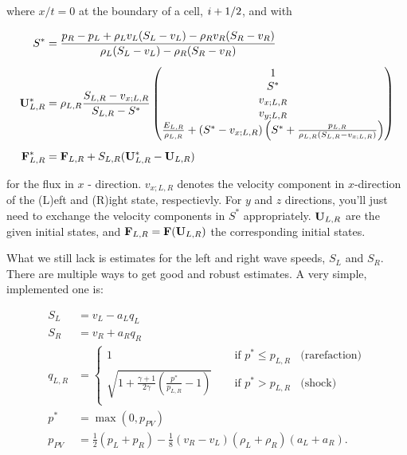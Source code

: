 where $x/t = 0$ at the boundary of a cell, $i+1/2$, and with

\begin{align}
S^* &=
	\frac{
		p_R - p_L  + \rho_L v_L (S_L - v_L) - \rho_R v_R (S_R - v_R)
	} {
		\rho_L (S_L - v_L) - \rho_R (S_R - v_R)
	}
	\label{eq:hllc-sstar}\\[.5em]
%
\U^*_{L,R} &=
	\rho_{L,R} \frac{ S_{L,R} - v_{x;L,R}}{S_{L,R} - S^*}
	\begin{pmatrix}
		1\\
		S^*\\
		v_{x;L,R}\\
		v_{y;L,R}\\
		\frac{E_{L,R}}{\rho_{L,R}} +
		(S^* - v_{x;L,R})
		\left(
			S^* + \frac{p_{L,R}}{\rho_{L,R}(S_{L,R} - v_{x;L,R})}
		\right)
	\end{pmatrix} \\[.5em]
%
\F^*_{L,R} &=
	\F_{L, R} + S_{L,R} ( \U^*_{L,R} - \U_{L,R} )
\end{align}

for the flux in $x$ - direction. $v_{x;L,R}$ denotes the velocity component in
$x$-direction of the (L)eft and (R)ight state, respectievly. For $y$ and $z$
directions, you'll just need to exchange the velocity components in $S^*$
appropriately. $\mathbf{U}_{L,R}$ are the given initial states, and $\mathbf{F}_{L,R} =
\mathbf{F}(\mathbf{U}_{L,R})$ the corresponding initial states.



What we still lack is estimates for the left and right wave speeds, $S_L$ and
$S_R$. There are multiple ways to get good and robust estimates. A very simple,
implemented one is:

\begin{align}
S_L  &= v_L - a_L q_L \\
S_R  &= v_R + a_R q_R \\
q_{L,R} &=
	\begin{cases}
		1	~~~~ &
			\text{ if } p^* \leq p_{L,R} ~~~~ \text{(rarefaction)}\\
		\sqrt{1 + \frac{\gamma + 1}{2 \gamma}
		\left(\frac{p^*}{p_{L,R}} - 1 \right)}	~~~~ &
		\text{ if } p^* > p_{L,R} ~~~~ \text{(shock)}\\
	\end{cases} \\
p^* &= \max(0, p_{PV})\\
p_{PV} &=
	\frac{1}{2} (p_L + p_R) -
	\frac{1}{8} (v_R - v_L)(\rho_L + \rho_R)(a_L + a_R)
	\label{eq:pstar-pv}.
\end{align}



